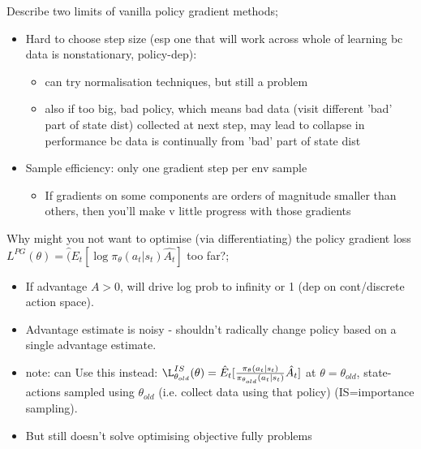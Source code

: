 \documentclass{article}
\begin{document}


Describe two limits of vanilla policy gradient methods; \begin{itemize} \item Hard to choose step size (esp one that will work across whole of learning bc data is nonstationary, policy-dep):  \begin{itemize} \item can try normalisation techniques, but still a problem \item also if too big, bad policy, which means bad data (visit different 'bad' part of state dist) collected at next step, may lead to collapse in performance bc data is continually from 'bad' part of state dist \end{itemize} \item Sample efficiency: only one gradient step per env sample \begin{itemize} \item If gradients on some components are orders of magnitude smaller than others, then you'll make v little progress with those gradients \end{itemize} \end{itemize}


Why might you not want to optimise (via differentiating) the policy gradient loss $L^{PG}(\theta) = \hat(E_t[\log\pi_\theta(a_t|s_t)\hat{A_t}]$ too far?; \begin{itemize} \item If advantage $A>0$, will drive log prob to infinity or 1 (dep on cont/discrete action space). \item Advantage estimate is noisy - shouldn't radically change policy based on a single advantage estimate. \item note: can Use this instead: $\L^{IS}_{\theta_{old}}(\theta) = \hat{E}_t[\frac{\pi_\theta(a_t|s_t)}{\pi_{\theta_{old}}(a_t|s_t)}\hat{A_t}]$ at $\theta=\theta_{old}$, state-actions sampled using $\theta_{old}$ (i.e. collect data using that policy) (IS=importance sampling). \item But still doesn't solve optimising objective fully problems \end{itemize}
\end{document}
